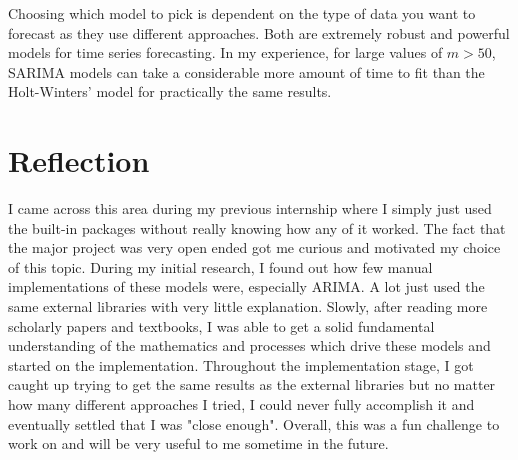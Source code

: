 \documentclass{article}
\begin{document}
  Choosing which model to pick is dependent on the type of data you want to forecast as they use different approaches. Both are extremely robust and powerful models for time series forecasting. In my experience, for large values of $m>50$, SARIMA models can take a considerable more amount of time to fit than the Holt-Winters' model for practically the same results.

  \section{Reflection}
  I came across this area during my previous internship where I simply just used the built-in packages without really knowing how any of it worked. The fact that the major project was very open ended got me curious and motivated my choice of this topic. During my initial research, I found out how few manual implementations of these models were, especially ARIMA. A lot just used the same external libraries with very little explanation. Slowly, after reading more scholarly papers and textbooks, I was able to get a solid fundamental understanding of the mathematics and processes which drive these models and started on the implementation. Throughout the implementation stage, I got caught up trying to get the same results as the external libraries but no matter how many different approaches I tried, I could never fully accomplish it and eventually settled that I was "close enough". Overall, this was a fun challenge to work on and will be very useful to me sometime in the future.

  \nocite{*}
  \printbibliography
\end{document}
